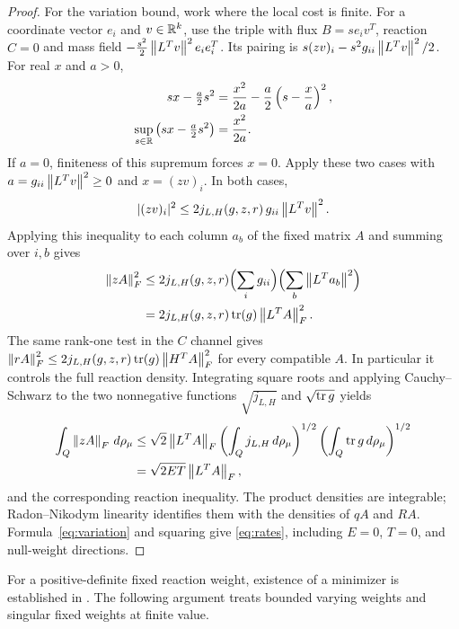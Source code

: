 \begin{proof}
For the variation bound, work where the local cost is finite. For a
coordinate vector $e_i$ and $v\in\mathbb R^k$, use the triple with flux
$B=se_iv^T$, reaction $C=0$ and mass field
$-\tfrac{s^2}2\left\lVert L^Tv\right\rVert^2e_ie_i^T$. Its pairing is
$s(zv)_i-s^2g_{ii}\left\lVert L^Tv\right\rVert^2/2$. For real $x$ and $a>0$,
\[
 \begin{aligned}
 sx-\tfrac a2s^2&=\frac{x^2}{2a}
                   -\frac a2\left(s-\frac xa\right)^2,\\
 \sup_{s\in\mathbb R}\left(sx-\tfrac a2s^2\right)&=\frac{x^2}{2a}.
 \end{aligned}
\]
If $a=0$, finiteness of this supremum forces $x=0$. Apply these two cases
with $a=g_{ii}\left\lVert L^Tv\right\rVert^2\ge0$ and $x=(zv)_i$. In both cases,
\[
 |(zv)_i|^2\le2j_{L,H}(g,z,r)\,g_{ii}\left\lVert L^Tv\right\rVert^2.
\]
Applying this inequality to each column $a_b$ of the fixed matrix $A$
and summing over $i,b$ gives
\[
 \begin{aligned}
 \left\lVert zA\right\rVert_F^2
 &\le2j_{L,H}(g,z,r)\Bigl(\sum_i g_{ii}\Bigr)
                            \Bigl(\sum_b\left\lVert L^Ta_b\right\rVert^2\Bigr)\\
 &=2j_{L,H}(g,z,r)\operatorname{tr}(g)\left\lVert L^TA\right\rVert_F^2.
 \end{aligned}
\]
The same rank-one test in the $C$ channel gives
$\left\lVert rA\right\rVert_F^2\le2j_{L,H}(g,z,r)\operatorname{tr}(g)\left\lVert H^TA\right\rVert_F^2$ for every
compatible $A$. In particular it controls the full reaction density.
Integrating square roots and applying Cauchy--Schwarz to the two
nonnegative functions $\sqrt{j_{L,H}}$ and $\sqrt{\operatorname{tr} g}$ yields
\[
 \begin{aligned}
 \int_Q\left\lVert zA\right\rVert_F\,d\rho_\mu
 &\le\sqrt2\left\lVert L^TA\right\rVert_F
       \left(\int_Qj_{L,H}\,d\rho_\mu\right)^{1/2}
       \left(\int_Q\operatorname{tr} g\,d\rho_\mu\right)^{1/2}\\
 &=\sqrt{2ET}\left\lVert L^TA\right\rVert_F,
 \end{aligned}
\]
and the corresponding reaction inequality. The product densities are
integrable; Radon--Nikodym linearity identifies them with the densities
of $qA$ and $RA$. Formula~\eqref{eq:variation} and squaring give
\eqref{eq:rates}, including $E=0$, $T=0$, and null-weight directions.
\end{proof}

For a positive-definite fixed reaction weight, existence of a minimizer is
established in \cite[Theorem 4.2]{LiZou}. The following argument treats
bounded varying weights and singular fixed weights at finite value.

